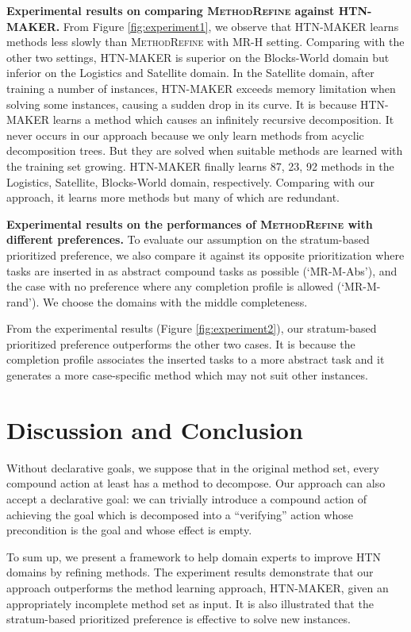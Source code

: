 \documentclass[letterpaper]{article} %
\begin{document}
\textbf{Experimental results on comparing \textsc{MethodRefine} against HTN-MAKER.}
From Figure \ref{fig:experiment1}, we observe that HTN-MAKER learns methods less slowly than \textsc{MethodRefine} with MR-H setting.
Comparing with the other two settings, HTN-MAKER is superior on the Blocks-World domain but inferior on the Logistics and Satellite domain.
In the Satellite domain, after training a number of instances, HTN-MAKER exceeds memory limitation when solving some instances, causing a sudden drop in its curve.
It is because HTN-MAKER learns a method which causes an infinitely recursive decomposition.
It never occurs in our approach because we only learn methods from acyclic decomposition trees.
But they are solved when suitable methods are learned with the training set growing.
HTN-MAKER finally learns 87, 23, 92 methods in the Logistics, Satellite, Blocks-World domain, respectively. Comparing with our approach, it learns more methods but many of which are redundant.

\textbf{Experimental results on the performances of \textsc{MethodRefine} with different preferences.}
To evaluate our assumption on the stratum-based prioritized preference, we also compare it against its opposite prioritization where tasks are inserted in as abstract compound tasks as possible (`MR-M-Abs'), and the case with no preference where any completion profile is allowed (`MR-M-rand').
We choose the domains with the middle completeness.

From the experimental results (Figure \ref{fig:experiment2}), our stratum-based prioritized preference outperforms the other two cases.
It is because the completion profile associates the inserted tasks to a more abstract task and it generates a more case-specific method which may not suit other instances.







\section{Discussion and Conclusion}
Without declarative goals,
we suppose that in the original method set, every compound action at least has a method to decompose.
Our approach can also accept a declarative goal: we can trivially introduce a compound action of achieving the goal which is decomposed into a ``verifying'' action whose precondition is the goal and whose effect is empty.

To sum up, we present a framework to help domain experts to improve HTN domains by refining methods.
The experiment results demonstrate that our approach outperforms the method learning approach, HTN-MAKER, given an appropriately incomplete method set as input.
It is also illustrated that the stratum-based prioritized preference is effective to solve new instances.
\end{document}
